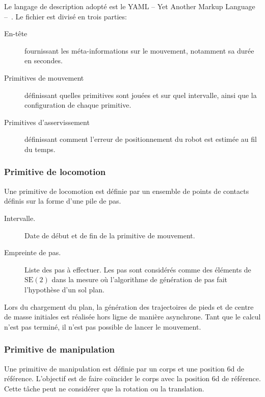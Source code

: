 Le langage de description adopté est le YAML -- Yet Another Markup
Language -- \citep{yaml}. Le
fichier est divisé en trois parties:
\begin{description}
\item[En-tête] fournissant les méta-informations sur le mouvement,
  notamment sa durée en secondes.
\item[Primitives de mouvement] définissant quelles primitives sont
  jouées et sur quel intervalle, ainsi que la configuration de chaque
  primitive.
\item[Primitives d'asservissement] définissant comment l'erreur de
  positionnement du robot est estimée au fil du temps.
\end{description}


\subsubsection{Primitive de locomotion}

Une primitive de locomotion est définie par un ensemble de points de
contacts définis sur la forme d'une pile de pas.

\begin{description}
\item[Intervalle.] Date de début et de fin de la primitive de mouvement.
\item[Empreinte de pas.] Liste des pas à effectuer. Les pas sont
  considérés comme des éléments de $\text{SE}(2)$ dans la mesure où
  l'algorithme de génération de pas fait l'hypothèse d'un sol plan.
\end{description}

Lors du chargement du plan, la génération des trajectoires de pieds et
de centre de masse initiales est réalisée hors ligne de manière
asynchrone. Tant que le calcul n'est pas terminé, il n'est pas
possible de lancer le mouvement.


\subsubsection{Primitive de manipulation}

Une primitive de manipulation est définie par un corps et une position
6d de référence. L'objectif est de faire coïncider le corps avec la
position 6d de référence. Cette tâche peut ne considérer que la
rotation ou la translation.

